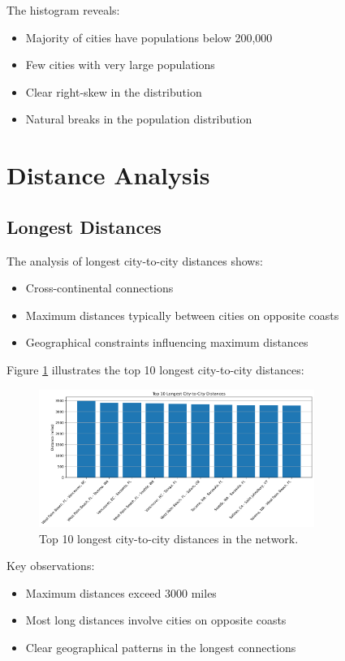 The histogram reveals:
\begin{itemize}
    \item Majority of cities have populations below 200,000
    \item Few cities with very large populations
    \item Clear right-skew in the distribution
    \item Natural breaks in the population distribution
\end{itemize}

\section{Distance Analysis}

\subsection{Longest Distances}
The analysis of longest city-to-city distances shows:
\begin{itemize}
    \item Cross-continental connections
    \item Maximum distances typically between cities on opposite coasts
    \item Geographical constraints influencing maximum distances
\end{itemize}

Figure \ref{fig:longest_dist} illustrates the top 10 longest city-to-city distances:

\begin{figure}[H]
    \centering
    \includegraphics[width=0.8\textwidth]{figures/longest_distances.png}
    \caption{Top 10 longest city-to-city distances in the network.}
    \label{fig:longest_dist}
\end{figure}

Key observations:
\begin{itemize}
    \item Maximum distances exceed 3000 miles
    \item Most long distances involve cities on opposite coasts
    \item Clear geographical patterns in the longest connections
\end{itemize}

